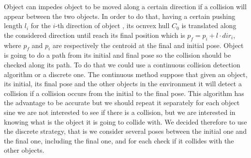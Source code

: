 Object  can impedes object  to be moved along a certain direction if a collision will appear between the two objects. In order to do that, having a certain pushing length $l_i$ for the $i$-th direction of object , its ocnvex hull $C_0$ is translated along the considered direction until reach its final position which is $p_f=p_i + l \cdot dir_i$, where $p_f$ and $p_i$ are respectively the centroid at the final and initial pose. Object  is going to do a path from its initial and final pose so the collision should be checked along its path. 
To do that we could use a continuous collision detection algorithm or a discrete one. The continuous method suppose that given an object, its initial, its final pose and the other objects in the environment it will detect a collision if a collision occurs from the initial to the final pose. This algorithm has the advantage to be accurate but we should repeat it separately for each object sine we are not interested to see if there is a collision, but we are interested in knowing what is the object it is going to collide with. We decided therefore to use the discrete strategy, that is we consider several poses between the initial one and the final one, including the final one, and for each check if it collides with the other objects. 



